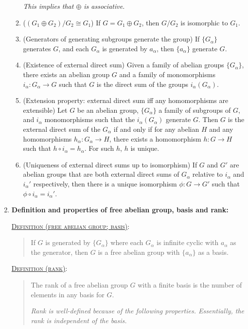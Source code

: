 \documentclass[letterpaper, 12pt]{article}
\newcommand{\defn}[2]{\textsc{\underline{Definition (#1)}:}\begin{quote} #2\end{quote}}
\begin{document}
\begin{enumerate}[resume]
\begin{enumerate}
                \textit{This implies that $\oplus$ is associative.}
                \item ($(G_1\oplus G_2)/G_2 \cong G_1$) If $G = G_1\oplus G_2$, then $G/G_2$ is isomorphic to $G_1$.
                \item (Generators of generating subgroups generate the group) If $\{G_\alpha\}$ generates $G$, and each $G_\alpha$ is generated by $a_\alpha$, then $\{a_\alpha\}$ generate $G$.
                \item (Existence of external direct sum) Given a family of abelian groups $\{G_\alpha\}$, there exists an abelian group $G$ and a family of monomorphisms $i_\alpha : G_\alpha \to G$ such that $G$ is the direct sum of the groups $i_\alpha(G_\alpha)$.
                \item (Extension property: external direct sum iff any homomorphisms are extensible) Let $G$ be an abelian group, $\{G_\alpha\}$ a family of subgroups of $G$, and $i_\alpha$ monomorphisms such that the $i_\alpha(G_\alpha)$ generate $G$. Then $G$ is the external direct sum of the $G_\alpha$ if and only if for any abelian $H$ and any homomorphisms $h_\alpha : G_\alpha \to H$, there exists a homomorphism $h: G\to H$ such that $h\circ i_\alpha = h_\alpha$. For such $h$, $h$ is unique.
                \item (Uniqueness of external direct sums up to isomorphism) If $G$ and $G'$ are abelian groups that are both external direct sums of $G_\alpha$ relative to $i_\alpha$ and $i_\alpha'$ respectively, then there is a unique isomorphism $\phi : G\to G'$ such that $\phi\circ i_\alpha = i_\alpha'$.
                \end{enumerate}
        \item \textbf{Definition and properties of free abelian group, basis and rank:}
            
            \defn{free abelian group; basis}{If $G$ is generated by $\{G_\alpha\}$ where each $G_\alpha$ is infinite cyclic with $a_\alpha$ as the generator, then $G$ is a free abelian group with $\{a_\alpha\}$ as a basis.}

            \defn{rank}{The rank of a free abelian group $G$ with a finite basis is the number of elements in any basis for $G$.

            \textit{Rank is well-defined because of the following properties. Essentially, the rank is independent of the basis.}}


\end{enumerate}
\end{document}
